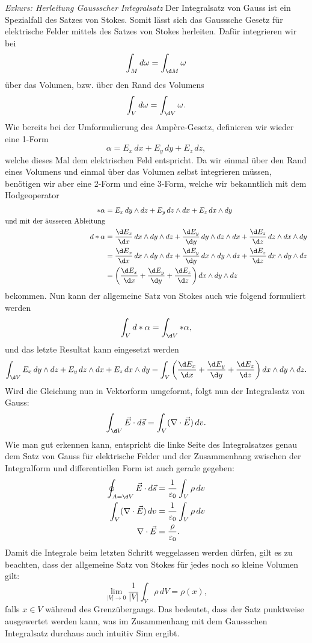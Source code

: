 \textit{Exkurs: Herleitung Gaussscher Integralsatz}
Der Integralsatz von Gauss ist ein Spezialfall des Satzes von Stokes.
Somit lässt sich das Gausssche Gesetz für elektrische Felder mittels des Satzes von Stokes herleiten.
Dafür integrieren wir bei
\[
\int_{M} d\omega
=
\int_{\d M} \omega
\]
über das Volumen, bzw. über den Rand des Volumens
\[
\int_{V} d\omega
=
\int_{\d V} \omega .
\]
Wie bereits bei der Umformulierung des Ampère-Gesetz, definieren wir wieder eine 1-Form
\[
\alpha
=
E_x \, dx + E_y \, dy + E_z \, dz ,
\]
welche dieses Mal dem elektrischen Feld entspricht.
Da wir einmal über den Rand eines Volumens und einmal über das Volumen selbst integrieren müssen, benötigen wir aber eine 2-Form und eine 3-Form, welche wir bekanntlich mit dem Hodgeoperator
\begin{align*}
	\ast\alpha
	&=
	E_x \, dy \wedge dz + E_y \, dz \wedge dx + E_z \, dx \wedge dy
	\\
\text{und mit der äusseren Ableitung}
	\\
	d\ast\alpha
	&=
	\frac{\d E_x}{\d x} \, dx \wedge dy \wedge dz +
	\frac{\d E_y}{\d y} \, dy \wedge dz \wedge dx +
	\frac{\d E_z}{\d z} \, dz \wedge dx \wedge dy
	\\ 
	&=
	\frac{\d E_x}{\d x} \, dx \wedge dy \wedge dz +
	\frac{\d E_y}{\d y} \, dx \wedge dy \wedge dz +
	\frac{\d E_z}{\d z} \, dx \wedge dy \wedge dz
	\\
	&=
	\left(
	\frac{\d E_x}{\d x} + \frac{\d E_y}{\d y} + \frac{\d E_z}{\d z}
	\right)
	dx \wedge dy \wedge dz 
\end{align*}
bekommen.
Nun kann der allgemeine Satz von Stokes auch wie folgend formuliert werden
\[
\int_{V} d \ast \alpha 
=
\int_{\d V} \ast \alpha ,
\]
und das letzte Resultat kann eingesetzt werden
\[
\int_{\d V}
E_x \, dy \wedge dz + E_y \, dz \wedge dx + E_z \, dx \wedge dy
=
\int_{V}
\left(
\frac{\d E_x}{\d x} + \frac{\d E_y}{\d y} + \frac{\d E_z}{\d z}
\right)
dx \wedge dy \wedge dz .
\]
Wird die Gleichung nun in Vektorform umgeformt, folgt nun der Integralsatz von Gauss:
\[
\int_{\d V}
\vec{E} \cdot d\vec{s}
=
\int_{V}
(\nabla \cdot \vec{E}) \, dv .
\]
Wie man gut erkennen kann, entspricht die linke Seite des Integralsatzes genau dem Satz von Gauss für elektrische Felder und der Zusammenhang zwischen der Integralform und differentiellen Form ist auch gerade gegeben:
\begin{align*}
	\oint_{A=\d V} \vec{E} \cdot d\vec{s}
	&=
	\frac{1}{\varepsilon_0}\int_{V} \rho \, dv
	\\
	\int_{V}
	(\nabla \cdot \vec{E}) \, dv
	&=
	\frac{1}{\varepsilon_0}\int_{V} \rho \, dv
	\\
	\nabla \cdot \vec{E}
	&=
	\frac{\rho}{\varepsilon_0}.
\end{align*} 
Damit die Integrale beim letzten Schritt weggelassen werden dürfen, gilt es zu beachten, dass der allgemeine Satz von Stokes für jedes noch so kleine Volumen gilt:
\[
\lim_{\left| V \right| \to 0} \frac{1}{\left| V \right|} \int_{V} \rho \, dV = \rho(x),
\]
falls $x\in V$ während des Grenzübergangs.
Das bedeutet, dass der Satz punktweise ausgewertet werden kann, was im Zusammenhang mit dem Gaussschen Integralsatz durchaus auch intuitiv Sinn ergibt.
